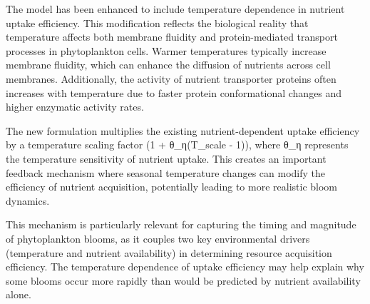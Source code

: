 The model has been enhanced to include temperature dependence in nutrient uptake efficiency. This modification reflects the biological reality that temperature affects both membrane fluidity and protein-mediated transport processes in phytoplankton cells. Warmer temperatures typically increase membrane fluidity, which can enhance the diffusion of nutrients across cell membranes. Additionally, the activity of nutrient transporter proteins often increases with temperature due to faster protein conformational changes and higher enzymatic activity rates.

The new formulation multiplies the existing nutrient-dependent uptake efficiency by a temperature scaling factor (1 + θ_η(T_scale - 1)), where θ_η represents the temperature sensitivity of nutrient uptake. This creates an important feedback mechanism where seasonal temperature changes can modify the efficiency of nutrient acquisition, potentially leading to more realistic bloom dynamics.

This mechanism is particularly relevant for capturing the timing and magnitude of phytoplankton blooms, as it couples two key environmental drivers (temperature and nutrient availability) in determining resource acquisition efficiency. The temperature dependence of uptake efficiency may help explain why some blooms occur more rapidly than would be predicted by nutrient availability alone.
